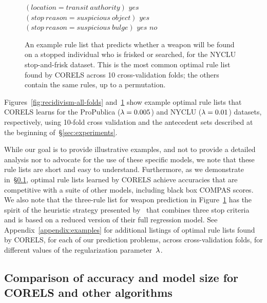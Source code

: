 \begin{figure}[t!]
\begin{algorithmic}
\State \bif $(location = transit~authority)$ \bthen $yes$
\State \belif $(stop~reason = suspicious~object)$ \bthen $yes$
\State \belif $(stop~reason = suspicious~bulge)$ \bthen $yes$
\State \belse $no$
\end{algorithmic}
\caption{An example rule list that predicts whether a weapon will be found on a
stopped individual who is frisked or searched, for the NYCLU stop-and-frisk dataset.
%
This is the most common optimal rule list found by CORELS across 10 cross-validation
folds; the others contain the same rules, up to a permutation.
}
\label{fig:weapon-rule-list}
\end{figure}

Figures~\ref{fig:recidivism-all-folds} and~\ref{fig:weapon-rule-list}
show example optimal rule lists that CORELS learns
for the ProPublica (${{\lambda} = 0.005}$) and NYCLU (${{\lambda} = 0.01}$) datasets, respectively,
using 10-fold cross validation and the antecedent sets described
at the beginning of~\S\ref{sec:experiments}.

While our goal is to provide illustrative examples, and not to provide a
detailed analysis nor to advocate for the use of these specific models,
we note that these rule lists are short and easy to understand.
%
Furthermore, as we demonstrate in~\S\ref{sec:sparsity},
optimal rule lists learned by CORELS achieve accuracies that are competitive
with a suite of other models, including black box COMPAS scores.
%
We also note that the three-rule list for weapon prediction
in Figure~\ref{fig:weapon-rule-list} has the spirit of the heuristic
strategy presented by~\citet{Goel16} that combines three stop criteria
and is based on a reduced version of their full regression model.
%
See Appendix~\ref{appendix:examples} for additional listings of optimal rule lists found
by CORELS, for each of our prediction problems, across cross-validation folds,
for different values of the regularization parameter~${\lambda}$.

\subsection{Comparison of accuracy and model size for CORELS and other algorithms}
\label{sec:sparsity}

